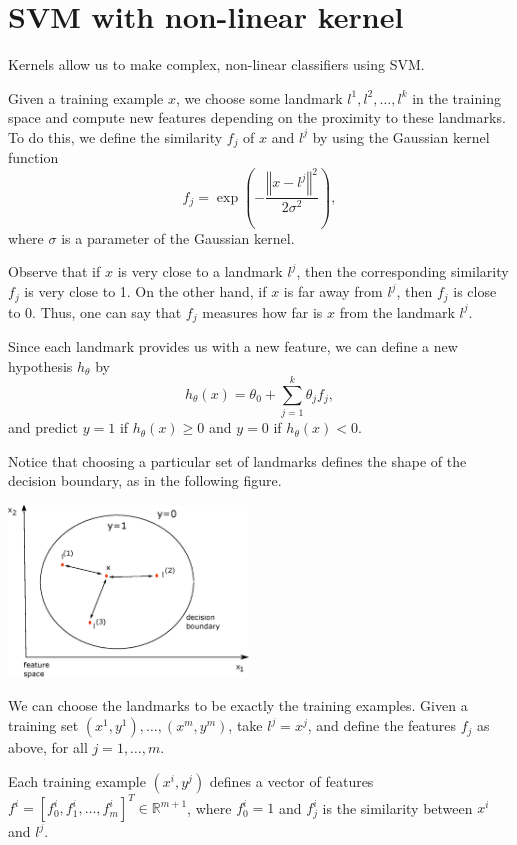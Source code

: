 \documentclass[a4paper,11pt]{report}
\newcommand{\norm}[1]{\left\Vert#1\right\Vert}
\newcommand{\ds}{\displaystyle}
\begin{document}
\section{SVM with non-linear kernel}

Kernels allow us to make complex, non-linear classifiers using SVM.

Given a training example $x$, we choose some landmark $l^{1}, l^{2}, \ldots, l^{k}$ in the training space and compute new features depending on the proximity to these landmarks. To do this, we define the similarity $f_j$ of $x$ and $l^{j}$ by using the Gaussian kernel function
$$f_j = \ds\exp\left(-\frac{\norm{x - l^{j}}^2}{2\sigma^2}\right),$$
where $\sigma$ is a parameter of the Gaussian kernel.

Observe that if $x$ is very close to a landmark $l^{j}$, then the corresponding similarity $f_j$ is very close to 1. On the other hand, if $x$ is far away from $l^{j}$, then $f_j$ is close to 0. Thus, one can say that $f_j$ measures how far is $x$ from the landmark $l^{j}$.

Since each landmark provides us with a new feature, we can define a new hypothesis $h_\theta$ by
$$h_\theta(x) = \theta_0 + \ds\sum_{j=1}^{k}{\theta_j f_j},$$
and predict $y=1$ if $h_\theta(x) \ge 0$ and $y=0$ if $h_\theta(x) < 0$.

Notice that choosing a particular set of landmarks defines the shape of the decision boundary, as in the following figure.

\hspace{1.0in}
\begin{center}
\includegraphics[height = 1.8in]{Images/kernel}
\end{center}

We can choose the landmarks to be exactly the training examples. Given a training set $(x^1, y^1), \ldots, (x^m, y^m)$, take $l^{j} = x^j$, and define the features $f_j$ as above, for all $j=1, \ldots, m$.

Each training example $(x^i, y^j)$ defines a vector of features $f^i = [f^i_0, f^i_1, \ldots, f^i_m]^T \in \mathbb{R}^{m+1}$, where $f^i_0 = 1$ and $f^i_j$ is the similarity between $x^i$ and $l^j$.
\end{document}
